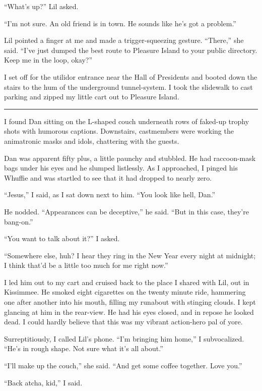 “What's up?” Lil asked.

“I'm not sure. An old friend is in town. He sounds like he's got a
problem.”

Lil pointed a finger at me and made a trigger-squeezing gesture.
“There,” she said. “I've just dumped the best route to Pleasure
Island to your public directory. Keep me in the loop, okay?”

I set off for the utilidor entrance near the Hall of Presidents and
booted down the stairs to the hum of the underground tunnel-system.
I took the slidewalk to cast parking and zipped my little cart out
to Pleasure Island.

\begin{center}\rule{1in}{0.4pt}\end{center}

I found Dan sitting on the L-shaped couch underneath rows of
faked-up trophy shots with humorous captions. Downstairs,
castmembers were working the animatronic masks and idols,
chattering with the guests.

Dan was apparent fifty plus, a little paunchy and stubbled. He had
raccoon-mask bags under his eyes and he slumped listlessly. As I
approached, I pinged his Whuffie and was startled to see that it
had dropped to nearly zero.

“Jesus,” I said, as I sat down next to him. “You look like hell,
Dan.”

He nodded. “Appearances can be deceptive,” he said. “But in this
case, they're bang-on.”

“You want to talk about it?” I asked.

“Somewhere else, huh? I hear they ring in the New Year every night
at midnight; I think that'd be a little too much for me right
now.”

I led him out to my cart and cruised back to the place I shared
with Lil, out in Kissimmee. He smoked eight cigarettes on the
twenty minute ride, hammering one after another into his mouth,
filling my runabout with stinging clouds. I kept glancing at him in
the rear-view. He had his eyes closed, and in repose he looked
dead. I could hardly believe that this was my vibrant action-hero
pal of yore.

Surreptitiously, I called Lil's phone. “I'm bringing him home,” I
subvocalized. “He's in rough shape. Not sure what it's all about.”

“I'll make up the couch,” she said. “And get some coffee together.
Love you.”

“Back atcha, kid,” I said.

